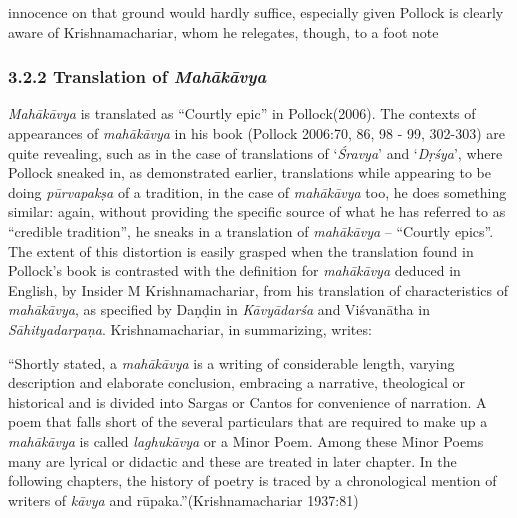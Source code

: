innocence on that ground would hardly suffice, especially given Pollock is clearly aware of Krishnamachariar, whom he relegates, though, to a foot note

\vskip -18pt


\subsubsection*{3.2.2 Translation of \textit{Mahākāvya}}

\vskip -5pt

\textit{Mahākāvya} is translated as “Courtly epic” in Pollock(2006). The contexts of appearances of \textit{mahākāvya} in his book (Pollock 2006:70, 86, 98 - 99, 302-303) are quite revealing, such as in the case of translations of ‘\textit{Śravya}’ and ‘\textit{Dṛśya}’, where Pollock sneaked in, as demonstrated earlier, translations while appearing to be doing \textit{pūrvapakṣa} of a tradition, in the case of \textit{mahākāvya} too, he does something similar: again, without providing the specific source of what he has referred to as “credible tradition”, he sneaks in a translation of \textit{mahākāvya} – “Courtly epics”. The extent of this distortion is easily grasped when the translation found in Pollock’s book is contrasted with the definition for \textit{mahākāvya} deduced in English, by Insider M Krishnamachariar, from his translation of characteristics of \textit{mahākāvya}, as specified by Daṇḍin in \textit{Kāvyādarśa} and Viśvanātha in \textit{Sāhityadarpaṇa}. Krishnamachariar, in summarizing, writes:

\begin{myquote}
“Shortly stated, a \textit{mahākāvya} is a writing of considerable length, varying description and elaborate conclusion, embracing a narrative, theological or historical and is divided into Sargas or Cantos for convenience of narration. A poem that falls short of the several particulars that are required to make up a \textit{mahākāvya} is called \textit{laghukāvya} or a Minor Poem. Among these Minor Poems many are lyrical or didactic and these are treated in later chapter. In the following chapters, the history of poetry is traced by a chronological mention of writers of \textit{kāvya} and rūpaka.”\hfill (Krishnamachariar 1937:81)
\end{myquote}

